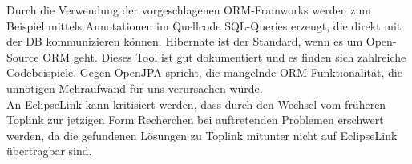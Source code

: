\documentclass[enabledeprecatedfontcommands,fontsize=11pt,paper=a4,twoside]{scrartcl}
\newcounter{one}
\begin{document}
\begin{onehalfspace}
	Durch die Verwendung der vorgeschlagenen ORM-Framworks werden zum Beispiel mittels Annotationen im Quellcode SQL-Queries erzeugt, die direkt mit der DB kommunizieren können. Hibernate ist der Standard, wenn es um Open-Source ORM geht. Dieses Tool ist gut dokumentiert und es finden sich zahlreiche Codebeispiele.
	Gegen OpenJPA spricht, die mangelnde ORM-Funktionalität, die unnötigen Mehraufwand für uns verursachen würde. \\
	An EclipseLink kann kritisiert werden, dass durch den Wechsel vom früheren Toplink zur jetzigen Form Recherchen bei auftretenden Problemen erschwert werden, da die gefundenen Lösungen zu Toplink mitunter nicht auf EclipseLink übertragbar sind.
\end{onehalfspace}
\end{document}
